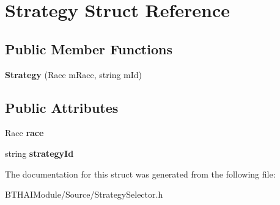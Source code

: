 \hypertarget{struct_strategy}{\section{Strategy Struct Reference}
\label{struct_strategy}
}
\subsection*{Public Member Functions}
\begin{DoxyCompactItemize}
\item 
\hypertarget{struct_strategy_ae298ccb71417fd10a58c8320fb6047ee}{{\bfseries Strategy} (Race m\-Race, string m\-Id)}\label{struct_strategy_ae298ccb71417fd10a58c8320fb6047ee}

\end{DoxyCompactItemize}
\subsection*{Public Attributes}
\begin{DoxyCompactItemize}
\item 
\hypertarget{struct_strategy_a1aa0c6ff07e0e7c36db34ee7cbb3afdc}{Race {\bfseries race}}\label{struct_strategy_a1aa0c6ff07e0e7c36db34ee7cbb3afdc}

\item 
\hypertarget{struct_strategy_ad244d2f318875458d872053572541150}{string {\bfseries strategy\-Id}}\label{struct_strategy_ad244d2f318875458d872053572541150}

\end{DoxyCompactItemize}


The documentation for this struct was generated from the following file\-:\begin{DoxyCompactItemize}
\item 
B\-T\-H\-A\-I\-Module/\-Source/Strategy\-Selector.\-h\end{DoxyCompactItemize}
